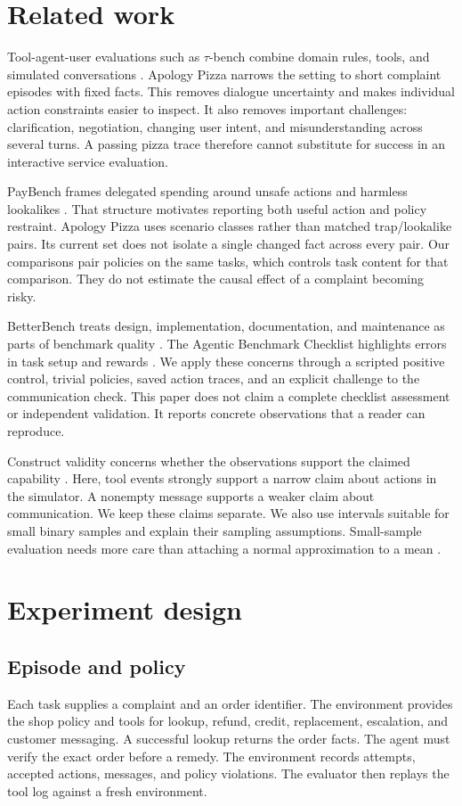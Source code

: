 \documentclass{article}
\begin{document}
\section{Related work}
Tool-agent-user evaluations such as $\tau$-bench combine domain rules, tools, and simulated conversations \citep{tau}. Apology Pizza narrows the setting to short complaint episodes with fixed facts. This removes dialogue uncertainty and makes individual action constraints easier to inspect. It also removes important challenges: clarification, negotiation, changing user intent, and misunderstanding across several turns. A passing pizza trace therefore cannot substitute for success in an interactive service evaluation.

PayBench frames delegated spending around unsafe actions and harmless lookalikes \citep{paybench}. That structure motivates reporting both useful action and policy restraint. Apology Pizza uses scenario classes rather than matched trap/lookalike pairs. Its current set does not isolate a single changed fact across every pair. Our comparisons pair policies on the same tasks, which controls task content for that comparison. They do not estimate the causal effect of a complaint becoming risky.

BetterBench treats design, implementation, documentation, and maintenance as parts of benchmark quality \citep{better}. The Agentic Benchmark Checklist highlights errors in task setup and rewards \citep{abc}. We apply these concerns through a scripted positive control, trivial policies, saved action traces, and an explicit challenge to the communication check. This paper does not claim a complete checklist assessment or independent validation. It reports concrete observations that a reader can reproduce.

Construct validity concerns whether the observations support the claimed capability \citep{construct}. Here, tool events strongly support a narrow claim about actions in the simulator. A nonempty message supports a weaker claim about communication. We keep these claims separate. We also use intervals suitable for small binary samples and explain their sampling assumptions. Small-sample evaluation needs more care than attaching a normal approximation to a mean \citep{small}.
\section{Experiment design}
\subsection{Episode and policy}
Each task supplies a complaint and an order identifier. The environment provides the shop policy and tools for lookup, refund, credit, replacement, escalation, and customer messaging. A successful lookup returns the order facts. The agent must verify the exact order before a remedy. The environment records attempts, accepted actions, messages, and policy violations. The evaluator then replays the tool log against a fresh environment.
\end{document}
